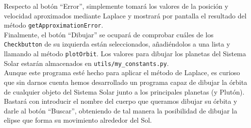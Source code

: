 \documentclass[11pt]{book}
\begin{document}
Respecto al botón ``Error'', simplemente tomará los valores de la posición y velocidad aproximados mediante Laplace y mostrará por pantalla el resultado del método \texttt{getApproximationError}.\\

Finalmente, el botón ``Dibujar'' se ocupará de comprobar cuáles de los \texttt{Checkbutton} de su izquierda están seleccionados, añadiéndolos a una lista y llamando al método \texttt{plotOrbit}. Los valores para dibujar los planetas del Sistema Solar estarán almacenados en \texttt{utils/my\_constants.py}.\\

Aunque este programa esté hecho para aplicar el método de Laplace, es curioso que sin darnos cuenta hemos desarrollado un programa capaz de dibujar la órbita de cualquier objeto del Sistema Solar junto a los principales planetas (y Plutón). Bastará con introducir el nombre del cuerpo que queramos dibujar su órbita y darle al botón ``Buscar'', obteniendo de tal manera la posibilidad de dibujar la elipse que forma su movimiento alrededor del Sol.\\















\newpage
\end{document}
